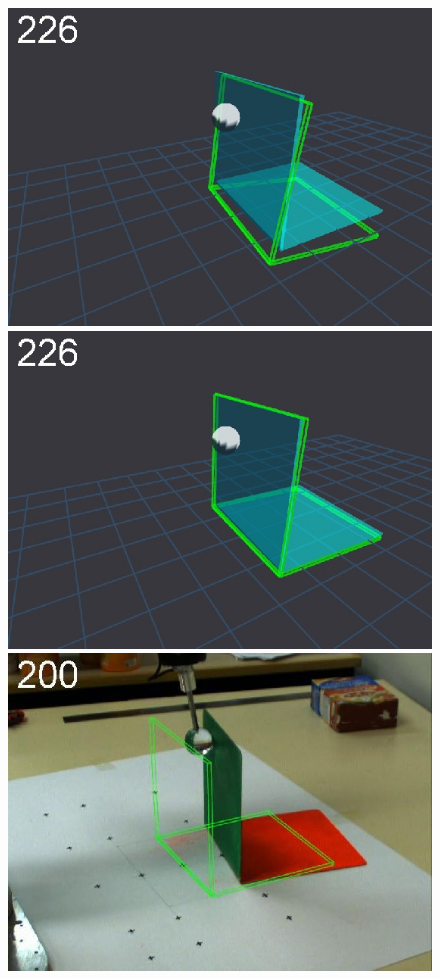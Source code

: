 \begin{figure}[tb]
{\includegraphics[width=\imgBXwid]{./B1_2exp_20_3}
\includegraphics[width=\imgBXwid]{./B1_3exp_20_3}
\includegraphics[width=\imgBXwid]{./B2_1exp_58_3}
}
\end{figure}
